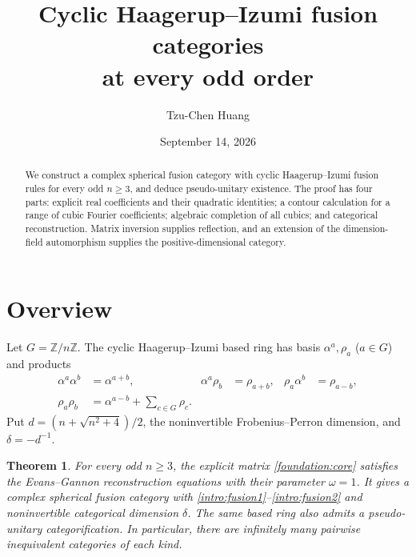 \documentclass[11pt]{article}
\title{Cyclic Haagerup--Izumi fusion categories\\at every odd order}
\author{Tzu-Chen Huang}
\date{September 14, 2026}
\numberwithin{equation}{section}
\newtheorem{theorem}{Theorem}[section]
\theoremstyle{definition}
\theoremstyle{remark}
\newcommand{\Z}{\mathbb Z}
\begin{document}
\maketitle
\begin{abstract}
We construct a complex spherical fusion category with cyclic
Haagerup--Izumi fusion rules for every odd $n\ge3$, and deduce
pseudo-unitary existence. The proof has four parts: explicit real
coefficients and their quadratic identities; a contour calculation
for a range of cubic Fourier coefficients; algebraic completion of
all cubics; and categorical reconstruction. Matrix inversion supplies
reflection, and an extension of the dimension-field automorphism
supplies the positive-dimensional category.
\end{abstract}


\begingroup
\small
\makeatletter
\renewcommand*\l@section{\@dottedtocline{1}{0pt}{1.8em}}
\makeatother
\tableofcontents
\endgroup
\clearpage


\section{Overview}
\label{sec:overview}

Let $G=\Z/n\Z$. The cyclic Haagerup--Izumi based ring has basis
$\alpha^a,\rho_a$ ($a\in G$) and products
\begin{align}
 \alpha^a\alpha^b&=\alpha^{a+b}, &
 \alpha^a\rho_b&=\rho_{a+b}, &
 \rho_a\alpha^b&=\rho_{a-b},\label{intro:fusion1}\\
 \rho_a\rho_b&=\alpha^{a-b}+\sum_{c\in G}\rho_c.
 \label{intro:fusion2}
\end{align}
Put $d=(n+\sqrt{n^2+4})/2$, the noninvertible
Frobenius--Perron dimension, and $\delta=-d^{-1}$.

\begin{theorem}\label{intro:main}
For every odd $n\ge3$, the explicit matrix \eqref{foundation:core}
satisfies the Evans--Gannon reconstruction equations
\cite[Eqs.~(4.7)--(4.10)]{EG} with their parameter $\omega=1$.
It gives a complex spherical fusion category with
\eqref{intro:fusion1}--\eqref{intro:fusion2} and noninvertible
categorical dimension $\delta$. The same based ring also admits a
pseudo-unitary categorification. In particular, there are infinitely
many pairwise inequivalent categories of each kind.
\end{theorem}
\end{document}
